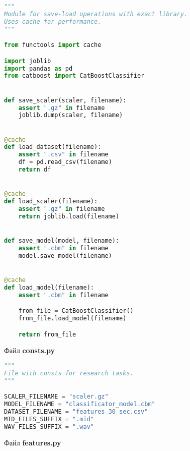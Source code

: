 \begin{lstlisting}[language=Python]
"""
Module for save-load operations with exact library.
Uses cache for performance.
"""

from functools import cache

import joblib
import pandas as pd
from catboost import CatBoostClassifier


def save_scaler(scaler, filename):
    assert ".gz" in filename
    joblib.dump(scaler, filename)


@cache
def load_dataset(filename):
    assert ".csv" in filename
    df = pd.read_csv(filename)
    return df


@cache
def load_scaler(filename):
    assert ".gz" in filename
    return joblib.load(filename)


def save_model(model, filename):
    assert ".cbm" in filename
    model.save_model(filename)


@cache
def load_model(filename):
    assert ".cbm" in filename

    from_file = CatBoostClassifier()
    from_file.load_model(filename)

    return from_file

\end{lstlisting}

Файл \textbf{consts.py}

\begin{lstlisting}[language=Python]
"""
File with consts for research tasks.
"""

SCALER_FILENAME = "scaler.gz"
MODEL_FILENAME = "classificator_model.cbm"
DATASET_FILENAME = "features_30_sec.csv"
MID_FILES_SUFFIX = ".mid"
WAV_FILES_SUFFIX = ".wav"

\end{lstlisting}

Файл \textbf{features.py}

